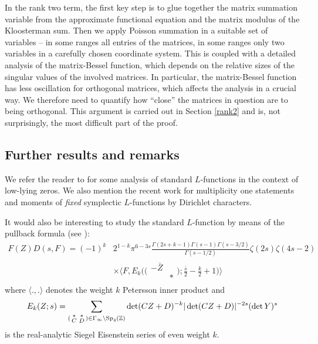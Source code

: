 \documentclass[11pt]{amsart}
\numberwithin{equation}{section}
\theoremstyle{plain}
\theoremstyle{definition}
\numberwithin{equation}{section}
\begin{document}
In the rank two term, the first key step is to glue together the matrix summation variable from the approximate functional equation and the matrix modulus of the Kloosterman sum. Then we apply Poisson summation in a suitable set of variables -- in some ranges all entries of the matrices, in some ranges only two variables in a carefully chosen coordinate system. This is coupled with a detailed analysis of the matrix-Bessel function, which depends on the relative sizes of the singular values of the involved matrices. In particular, the matrix-Bessel function has less oscillation for orthogonal matrices, which affects the analysis in a crucial way. We therefore need to quantify how ``close'' the matrices in question are to being orthogonal. This argument is carried out in Section \ref{rank2} and is, not surprisingly, the most difficult part of the proof. 

\subsection{Further results and remarks}

We refer the reader to \cite{Zh, KWY} for some analysis of standard $L$-functions in the context of low-lying zeros. We also mention the recent work \cite{wwyy} for multiplicity one statements and moments of \emph{fixed} symplectic $L$-functions by Dirichlet characters.  

It would also be interesting to study the standard $L$-function by means of the pullback formula (see \cite{Bo}):
\begin{displaymath}
\begin{split}
F(Z) D(s, F) = (-1)^k & 2^{1-k}   \pi^{6-3s}  \frac{\Gamma(2s + k - 1) \Gamma(s-1)\Gamma(s - 3/2)}{\Gamma(s - 1/2)}\zeta(2s) \zeta(4s-2) \\
& \times \Big\langle  F, E_k\Big(\Big(\begin{matrix} -\bar{Z} & \\ & * \end{matrix}\Big) ; \frac{\bar{s}}{2} - \frac{k}{2}+ 1 \Big)\Big\rangle
\end{split}
\end{displaymath}
where $\langle .,. \rangle$ denotes the weight $k$ Petersson inner product and 
\[  E_k(Z; s) = \sum_{(\begin{smallmatrix} * & *\\ C & D\end{smallmatrix}) \in \Gamma_{\infty} \backslash {\rm Sp}_4(\mathbb{Z})} \det (CZ + D)^{-k} |\det (CZ+D)|^{-2s} (\det Y)^s \]
is the real-analytic Siegel Eisenstein series of even weight $k$. 
\end{document}
